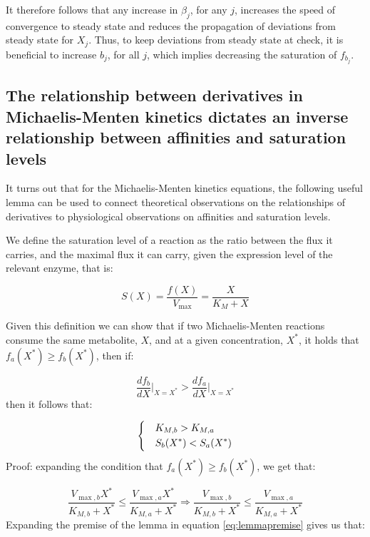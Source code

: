  It therefore follows that any increase in $\beta_j$, for any $j$, increases the speed of convergence to steady state and reduces the propagation of deviations from steady state for $X_j$.
 Thus, to keep deviations from steady state at check, it is beneficial to increase $b_j$, for all $j$, which implies decreasing the saturation of $f_{b_j}$.


    \subsection{The relationship between derivatives in Michaelis-Menten kinetics dictates an inverse relationship between affinities and saturation levels}
    It turns out that for the Michaelis-Menten kinetics equations, the following useful lemma can be used to connect theoretical observations on the relationships of derivatives to physiological observations on affinities and saturation levels.

    We define the saturation level of a reaction as the ratio between the flux it carries, and the maximal flux it can carry, given the expression level of the relevant enzyme, that is:

    \begin{equation*}
      S(X)=\frac{f(X)}{V_{\max}}=\frac{X}{K_M+X}
    \end{equation*}

    Given this definition we can show that if two Michaelis-Menten reactions consume the same metabolite, $X$, and at a given concentration, $X^*$, it holds that $f_a(X^*)\geq f_b(X^*)$, then if:

    \begin{equation}
        \frac{df_b}{dX}\Big\vert_{X=X^*}>\frac{df_a}{dX}\Big\vert_{X=X^*}
        \label{eq:lemmapremise}
    \end{equation}
    then it follows that:

    \begin{equation*}
    \begin{dcases}
      & K_{M,b}>K_{M,a} \\
      & S_b(X^*)<S_a(X^*)
    \end{dcases}
    \end{equation*}
    Proof: expanding the condition that $f_a(X^*)\geq f_b(X^*)$, we get that:

    \begin{equation}
        \frac{V_{\max,b}X^*}{K_{M,b}+X^*}\leq\frac{V_{\max,a}X^*}{K_{M,a}+X^*} \Rightarrow
         \frac{V_{\max,b}}{K_{M,b}+X^*}\leq\frac{V_{\max,a}}{K_{M,a}+X^*}
         \label{eq:firstmid}
     \end{equation}
     Expanding the premise of the lemma in equation \ref{eq:lemmapremise} gives us that:

